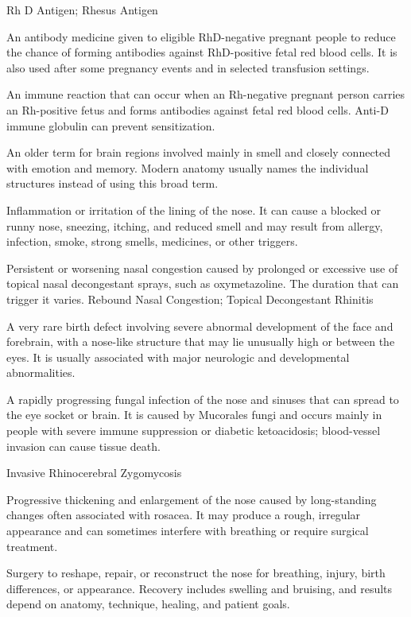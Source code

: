 \synonyms
Rh D Antigen; Rhesus Antigen

 An antibody medicine given to eligible RhD-negative pregnant people to reduce the chance of forming antibodies against RhD-positive fetal red blood cells. It is also used after some pregnancy events and in selected transfusion settings.

 An immune reaction that can occur when an Rh-negative pregnant person carries an Rh-positive fetus and forms antibodies against fetal red blood cells. Anti-D immune globulin can prevent sensitization.

 An older term for brain regions involved mainly in smell and closely connected with emotion and memory. Modern anatomy usually names the individual structures instead of using this broad term.

 Inflammation or irritation of the lining of the nose. It can cause a blocked or runny nose, sneezing, itching, and reduced smell and may result from allergy, infection, smoke, strong smells, medicines, or other triggers.

 Persistent or worsening nasal congestion caused by prolonged or excessive use of topical nasal decongestant sprays, such as oxymetazoline. The duration that can trigger it varies.
\synonyms
Rebound Nasal Congestion; Topical Decongestant Rhinitis

 A very rare birth defect involving severe abnormal development of the face and forebrain, with a nose-like structure that may lie unusually high or between the eyes. It is usually associated with major neurologic and developmental abnormalities.

 A rapidly progressing fungal infection of the nose and sinuses that can spread to the eye socket or brain. It is caused by Mucorales fungi and occurs mainly in people with severe immune suppression or diabetic ketoacidosis; blood-vessel invasion can cause tissue death.

\synonyms
Invasive Rhinocerebral Zygomycosis

 Progressive thickening and enlargement of the nose caused by long-standing changes often associated with rosacea. It may produce a rough, irregular appearance and can sometimes interfere with breathing or require surgical treatment.

 Surgery to reshape, repair, or reconstruct the nose for breathing, injury, birth differences, or appearance. Recovery includes swelling and bruising, and results depend on anatomy, technique, healing, and patient goals.


